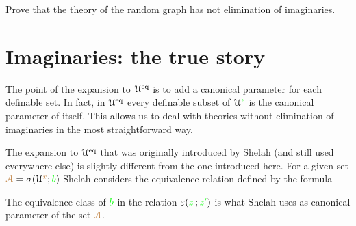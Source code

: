\begin{exercise}
  Prove that the theory of the random graph has not elimination of imaginaries.
\end{exercise}


\section{Imaginaries: the true story}\label{imaginaries_long}

The point of the expansion to $\EuScript U^{{\rm eq}}$ is to add a canonical parameter for each definable set.
In fact, in $\EuScript U^{{\rm eq}}$ every definable subset of $\EuScript U^{\color{green} z}$ is the canonical parameter of itself.
This allows us to deal with theories without elimination of imaginaries in the most straightforward way.

The expansion to $\EuScript U^{{\rm eq}}$ that was originally introduced by Shelah (and still used everywhere else) is slightly different from the one introduced here.
For a given set ${\color{brown}\EuScript A}=\sigma(\EuScript U^{\color{brown} x};{\color{green} b})$ Shelah considers the equivalence relation defined by the formula


The equivalence class of ${\color{green} b}$ in the relation $\varepsilon({\color{green} z}\,;{\color{green} z'})$ is what Shelah uses as canonical parameter of the set ${\color{brown}\EuScript A}$.

